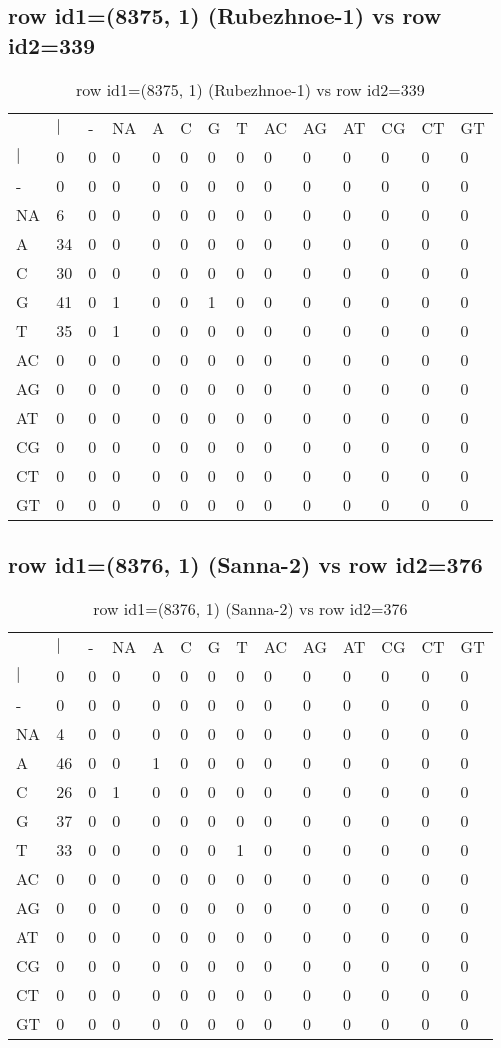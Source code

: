 \subsection{row id1=(8375, 1) (Rubezhnoe-1) vs row id2=339}
\begin{center}
\begin{longtable}{|l|l|l|l|l|l|l|l|l|l|l|l|l|l|}
\caption{row id1=(8375, 1) (Rubezhnoe-1) vs row id2=339} \label{table_dm606}\\
\hline
\\
\hline
&$|$&-&NA&A&C&G&T&AC&AG&AT&CG&CT&GT\\
$|$&0&0&0&0&0&0&0&0&0&0&0&0&0\\
-&0&0&0&0&0&0&0&0&0&0&0&0&0\\
NA&6&0&0&0&0&0&0&0&0&0&0&0&0\\
A&34&0&0&0&0&0&0&0&0&0&0&0&0\\
C&30&0&0&0&0&0&0&0&0&0&0&0&0\\
G&41&0&1&0&0&1&0&0&0&0&0&0&0\\
T&35&0&1&0&0&0&0&0&0&0&0&0&0\\
AC&0&0&0&0&0&0&0&0&0&0&0&0&0\\
AG&0&0&0&0&0&0&0&0&0&0&0&0&0\\
AT&0&0&0&0&0&0&0&0&0&0&0&0&0\\
CG&0&0&0&0&0&0&0&0&0&0&0&0&0\\
CT&0&0&0&0&0&0&0&0&0&0&0&0&0\\
GT&0&0&0&0&0&0&0&0&0&0&0&0&0\\
\hline
\end{longtable}
\end{center}

\subsection{row id1=(8376, 1) (Sanna-2) vs row id2=376}
\begin{center}
\begin{longtable}{|l|l|l|l|l|l|l|l|l|l|l|l|l|l|}
\caption{row id1=(8376, 1) (Sanna-2) vs row id2=376} \label{table_dm608}\\
\hline
\\
\hline
&$|$&-&NA&A&C&G&T&AC&AG&AT&CG&CT&GT\\
$|$&0&0&0&0&0&0&0&0&0&0&0&0&0\\
-&0&0&0&0&0&0&0&0&0&0&0&0&0\\
NA&4&0&0&0&0&0&0&0&0&0&0&0&0\\
A&46&0&0&1&0&0&0&0&0&0&0&0&0\\
C&26&0&1&0&0&0&0&0&0&0&0&0&0\\
G&37&0&0&0&0&0&0&0&0&0&0&0&0\\
T&33&0&0&0&0&0&1&0&0&0&0&0&0\\
AC&0&0&0&0&0&0&0&0&0&0&0&0&0\\
AG&0&0&0&0&0&0&0&0&0&0&0&0&0\\
AT&0&0&0&0&0&0&0&0&0&0&0&0&0\\
CG&0&0&0&0&0&0&0&0&0&0&0&0&0\\
CT&0&0&0&0&0&0&0&0&0&0&0&0&0\\
GT&0&0&0&0&0&0&0&0&0&0&0&0&0\\
\hline
\end{longtable}
\end{center}

